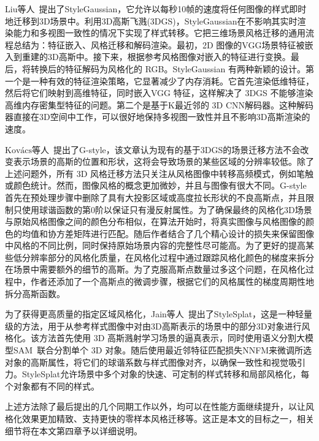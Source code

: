 \par Liu等人~\cite{liu2024stylegaussian}提出了StyleGaussian，它允许以每秒10帧的速度将任何图像的样式即时地迁移到3D场景中。利用3D高斯飞溅(3DGS)，StyleGaussian在不影响其实时渲染能力和多视图一致性的情况下实现了样式转移。它把三维场景风格迁移的通用流程总结为：特征嵌入、风格迁移和解码渲染。最初，2D 图像的VGG场景特征被嵌入到重建的3D高斯中。接下来，根据参考风格图像对嵌入的特征进行变换。最后，将转换后的特征解码为风格化的 RGB。StyleGaussian 有两种新颖的设计。第一个是一种有效的特征渲染策略，它显著减少了内存消耗。它首先渲染低维特征，然后将它们映射到高维特征，同时嵌入VGG 特征，这样解决了 3DGS 不能够渲染高维内存密集型特征的问题。第二个是基于K最近邻的 3D CNN解码器。这种解码器直接在3D空间中工作，可以很好地保持多视图一致性并且不影响3D高斯渲染的速度。

\par \(\text{Kovács}\)等人~\cite{kovacs2024g}提出了G-style，该文章认为现有的基于3DGS的场景迁移方法不会改变表示场景的高斯的位置和形状，这将会导致场景的某些区域的分辨率较低。除了上述问题外，所有 3D 风格迁移方法只关注从风格图像中转移高频模式，例如笔触或颜色统计。然而，图像风格的概念更加微妙，并且与图像有很大不同。G-style首先在预处理步骤中删除了具有大投影区域或高度拉长形状的不良高斯点，并且限制只使用球谐函数的第0阶以保证只有漫反射属性。为了确保最终的风格化3D场景与原始风格图像之间的颜色分布相似，在算法开始时，将真实图像与风格图像的颜色的均值和协方差矩阵进行匹配。随后作者结合了几个精心设计的损失来保留图像中风格的不同比例，同时保持原始场景内容的完整性尽可能高。为了更好的提高某些低分辨率部分的风格化质量，在风格化过程中通过跟踪风格化颜色的梯度来拆分在场景中需要额外的细节的高斯。为了克服高斯点数量过多这个问题，在风格化过程中，作者还添加了一个高斯点的微调步骤，根据它们的风格属性的梯度周期性地拆分高斯函数。

\par 为了获得更高质量的指定区域风格化，Jain等人~\cite{jain2024stylesplat}提出了StyleSplat，这是一种轻量级的方法，用于从参考样式图像中对由3D高斯表示的场景中的部分3D对象进行风格化。该方法首先使用 3D 高斯溅射学习场景的逼真表示，同时使用语义分割大模型SAM~\cite{kirillov2023segment}联合分割单个 3D 对象。随后使用最近邻特征匹配损失NNFM来微调所选对象的高斯属性，将它们的球谐系数与样式图像对齐，以确保一致性和视觉吸引力。StyleSplat允许场景中多个对象的快速、可定制的样式转移和局部风格化，每个对象都有不同的样式。

\par 上述方法除了最后提出的几个同期工作以外，均可以在性能方面继续提升，以让风格化效果更加精致、支持更快的零样本风格迁移等。这正是本文的目标之一，相关细节将在本文第四章予以详细说明。

